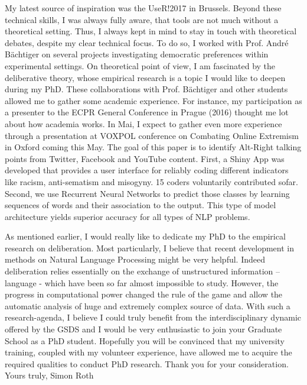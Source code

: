 \documentclass[10pt]{article}
\begin{document}
 My latest source of inspiration was the UseR!2017 in Brussels. Beyond these technical skills, I was always fully aware, that tools are not much without a theoretical setting. Thus, I always kept in mind to stay in touch with theoretical debates, despite my clear technical focus. To do so, I worked with Prof. André Bächtiger on several projects investigating democratic preferences within experimental settings. On theoretical point of view, I am fascinated by the deliberative theory, whose empirical research is a topic I would like to deepen during my PhD. These collaborations with Prof. Bächtiger and other students allowed me to gather some academic experience. For instance, my participation as a presenter to the ECPR General Conference in Prague (2016) thought me lot about how academia works. In Mai, I expect to gather even more experience through a presentation at VOXPOL conference on Combating Online Extremism in Oxford coming this May. The goal of this paper is to identify Alt-Right talking points from Twitter, Facebook and YouTube content. First, a Shiny App was developed that provides a user interface for reliably coding different indicators like racism, anti-sematism and misogyny. 15 coders voluntarily contributed sofar. Second, we use Recurrent Neural Networks to predict those classes by learning sequences of words and their association to the output. This type of model architecture yields superior accuracy for all types of NLP problems. 
 
 \vspace{0.3cm}
 
 As mentioned earlier, I would really like to dedicate my PhD to the empirical research on deliberation. Most particularly, I believe that recent development in methods on Natural Language Processing might be very helpful. Indeed deliberation relies essentially on the exchange of unstructured information – language - which have been so far almost impossible to study. However, the progress in computational power changed the rule of the game and allow the automatic analysis of huge and extremely complex source of data. With such a research-agenda, I believe I could truly beneﬁt from the interdisciplinary dynamic offered by the GSDS and I would be very enthusiastic to join your Graduate School as a PhD student. Hopefully you will be convinced that my university training, coupled with my volunteer experience, have allowed me to acquire the required qualities to conduct PhD research. Thank you for your consideration. Yours truly, Simon Roth
\end{document}
